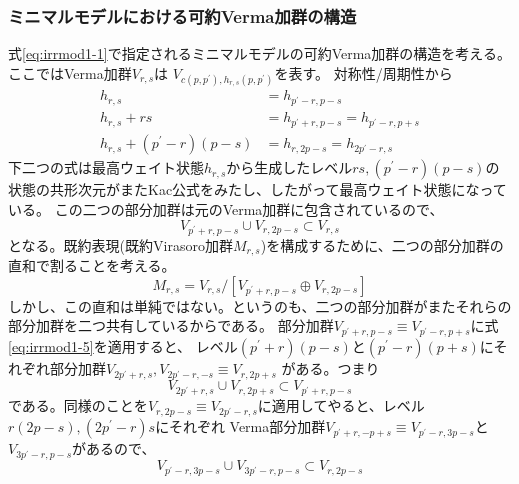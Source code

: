 \documentclass[11pt, aps, longbibliography]{article}
\numberwithin{equation}{section}
\begin{document}
        \subsubsection{ミニマルモデルにおける可約Verma加群の構造}
        式\eqref{eq:irrmod1-1}で指定されるミニマルモデルの可約Verma加群の構造を考える。ここではVerma加群$V_{r,s}$は
        $V_{c(p,p^\prime),h_{r,s}(p,p^\prime)}$を表す。
        対称性/周期性から
        \begin{align}\label{eq:irrmod1-2}
            h_{r,s} &= h_{p^\prime-r,p-s} \\
            h_{r,s} + rs &= h_{p^\prime+r,p-s} = h_{p^\prime-r,p+s} \label{eq:irrmod1-5}\\
            h_{r,s} + (p^\prime -r)(p-s) &= h_{r,2p-s} = h_{2p^\prime-r,s}  \label{eq:irrmod1-6}
        \end{align}
        下二つの式は最高ウェイト状態$h_{r,s}$から生成したレベル$rs, (p^\prime-r)(p-s)$の状態の共形次元がまたKac公式をみたし、したがって最高ウェイト状態になっている。
        この二つの部分加群は元のVerma加群に包含されているので、
        \begin{equation}\label{eq:irrmod1-3}
            V_{p^\prime+r,p-s} \cup V_{r,2p-s} \subset V_{r,s}
        \end{equation}
        となる。既約表現(既約Virasoro加群$M_{r,s}$)を構成するために、二つの部分加群の直和で割ることを考える。
        \begin{equation}\label{eq:irrmod1-4}
            M_{r,s} = V_{r,s}/\left[ V_{p^\prime+r,p-s}\oplus V_{r,2p-s} \right]
        \end{equation}
        しかし、この直和は単純ではない。というのも、二つの部分加群がまたそれらの部分加群を二つ共有しているからである。
        部分加群$V_{p^\prime+r,p-s}\equiv V_{p^\prime-r,p+s}$に式\eqref{eq:irrmod1-5}を適用すると、
        レベル$(p^\prime+r)(p-s)$と$(p^\prime-r)(p+s)$にそれぞれ部分加群$V_{2p^\prime+r,s},V_{2p^\prime-r,-s}\equiv V_{r,2p+s}$
        がある。つまり
        \begin{equation}\label{eq:irrmod1-7}
            V_{2p^\prime+r,s} \cup  V_{r,2p+s} \subset V_{p^\prime+r,p-s}
        \end{equation}
        である。同様のことを$V_{r,2p-s}\equiv V_{2p^\prime -r, s}$に適用してやると、レベル$r(2p-s),(2p^\prime-r)s$にそれぞれ
        Verma部分加群$V_{p^\prime+r,-p+s}\equiv V_{p^\prime-r, 3p-s}$と$V_{3p^\prime -r,p-s}$があるので、
        \begin{equation}\label{eq:irrmod1-8}
            V_{p^\prime-r,3p-s} \cup  V_{3p^\prime-r,p-s} \subset V_{r,2p-s}
        \end{equation}
\end{document}
